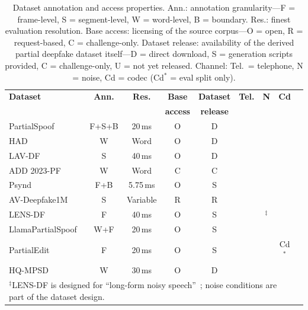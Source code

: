 \documentclass[journal]{IEEEtran}
\newcommand{\cmark}{\ding{51}}
\newcommand{\xmark}{\ding{55}}
\begin{document}
\begin{table}[t]
\centering
\caption{Dataset annotation and access properties. Ann.: annotation granularity---F = frame-level, S = segment-level, W = word-level, B = boundary. Res.: finest evaluation resolution. Base access: licensing of the source corpus---O = open, R = request-based, C = challenge-only. Dataset release: availability of the derived partial deepfake dataset itself---D = direct download, S = generation scripts provided, C = challenge-only, U = not yet released. Channel: Tel.\ = telephone, N = noise, Cd = codec (Cd$^*$ = eval split only).}
\label{tab:dataset_access}
\small
\begin{tabular}{lcccccccc}
\toprule
\textbf{Dataset} & \textbf{Ann.} & \textbf{Res.} & \textbf{Base} & \textbf{Dataset} & \textbf{Tel.} & \textbf{N} & \textbf{Cd} \\
 & & & \textbf{access} & \textbf{release} & & & \\
\midrule
PartialSpoof~\cite{zhang2023partialspoof} & F+S+B & 20\,ms & O & D & \xmark & \xmark & \xmark \\
HAD~\cite{yi2021had}                      & W     & Word   & O & D & \xmark & \xmark & \xmark \\
LAV-DF~\cite{cai2022lavdf}               & S     & 40\,ms & O & D & \xmark & \xmark & \xmark \\
ADD 2023-PF~\cite{yi2023add}             & W     & Word   & C & C & \xmark & \xmark & \xmark \\
Psynd~\cite{zhang2022localizing}          & F+B   & 5.75\,ms & O & S & \xmark & \xmark & \xmark \\
AV-Deepfake1M~\cite{cai2024avdeepfake1m} & S     & Variable & R & R & \xmark & \xmark & \xmark \\
LENS-DF~\cite{liu2025lensdf}             & F     & 40\,ms & O & S & \xmark & \cmark$^\ddag$ & \xmark \\
LlamaPartialSpoof~\cite{luong2025llamapartialspoof} & W+F & 20\,ms & O & S & \xmark & \xmark & \xmark \\
PartialEdit~\cite{zhang2025partialedit}  & F     & 20\,ms & O & S & \xmark & \xmark & Cd$^*$ \\
HQ-MPSD~\cite{li2025hqmpsd}             & W     & 30\,ms & O & D & \xmark & \xmark & \xmark \\
\bottomrule
\multicolumn{8}{l}{\footnotesize $^\ddag$LENS-DF is designed for ``long-form noisy speech''~\cite{liu2025lensdf}; noise conditions are part of the dataset design.}
\end{tabular}
\end{table}
\end{document}
